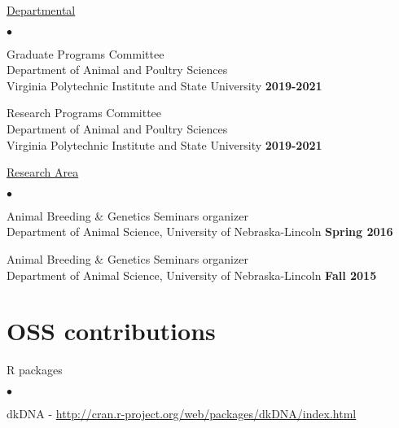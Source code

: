 \documentclass[margin,line,10pt]{res}
\newenvironment{list1}{
  \begin{list}{\ding{113}}{%
      \setlength{\itemsep}{0in}
      \setlength{\parsep}{0in} \setlength{\parskip}{0in}
      \setlength{\topsep}{0in} \setlength{\partopsep}{0in} 
      \setlength{\leftmargin}{0.17in}}}{\end{list}}
\newenvironment{list2}{
  \begin{list}{$\bullet$}{%
      \setlength{\itemsep}{0in}
      \setlength{\parsep}{0in} \setlength{\parskip}{0in}
      \setlength{\topsep}{0in} \setlength{\partopsep}{0in} 
      \setlength{\leftmargin}{0.2in}}}{\end{list}}
\begin{document}
\begin{resume}
\begin{flushleft}
  \hspace{0.3cm} \underline{Departmental}
\end{flushleft}
\begin{list2}
\item Graduate Programs Committee \\
  Department of Animal and Poultry Sciences \\ Virginia Polytechnic Institute and State University   \hfill \textbf{2019-2021}\\

\item Research Programs Committee \\
  Department of Animal and Poultry Sciences \\ Virginia Polytechnic Institute and State University  \hfill \textbf{2019-2021}\\

\end{list2}


\begin{flushleft}
\hspace{0.3cm} \underline{Research Area}
\end{flushleft}
\begin{list2}
\item Animal Breeding \& Genetics Seminars organizer \\
  Department of Animal Science, University of Nebraska-Lincoln   \hfill \textbf{Spring 2016}\\

\item Animal Breeding \& Genetics Seminars organizer \\
  Department of Animal Science, University of Nebraska-Lincoln   \hfill \textbf{Fall 2015}\\
\end{list2}






\vspace{0.5cm}
\section{\sc OSS contributions} 
\begin{list1}
\item[] R packages
\begin{list2}
\item dkDNA - \textcolor{blue}{\href{http://cran.r-project.org/web/packages/dkDNA/index.html}{http://cran.r-project.org/web/packages/dkDNA/index.html}}
\end{list2}



\end{list1}
\end{resume}
\end{document}
